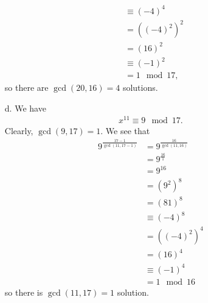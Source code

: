 \documentclass[12 pt]{amsart}
\begin{document}
\begin{enumerate}
\begin{align*}
                                         &\equiv (-4)^{4} \\
                                         &= \left((-4)^2\right)^{2} \\
                                         &= (16)^{2} \\
                                         &\equiv (-1)^{2} \\
                                         &= 1 \mod 17,
      \end{align*}
      so there are $\gcd(20, 16) = 4$ solutions. 
		\item[d.]
      We have
      \begin{align*}
        x^{11} \equiv 9 \mod 17.
      \end{align*}
      Clearly, $\gcd(9, 17) = 1$. 
      We see that 
      \begin{align*}
        9^{\frac{17-1}{\gcd(11, 17-1)}} &= 9^{\frac{16}{\gcd(11, 16)}} \\
                                         &= 9^{\frac{16}{1}} \\
                                         &= 9^{16} \\
                                         &= \left(9^2\right)^{8} \\
                                         &= \left(81\right)^{8} \\
                                         &\equiv \left(-4\right)^{8} \\
                                         &= \left((-4)^2\right)^{4} \\
                                         &= \left(16\right)^{4} \\
                                         &\equiv \left(-1\right)^{4} \\
                                         &= 1 \mod 16 
      \end{align*}
      so there is $\gcd(11, 17) = 1$ solution.
	\end{enumerate}
\vfill
\newpage
\end{document}
